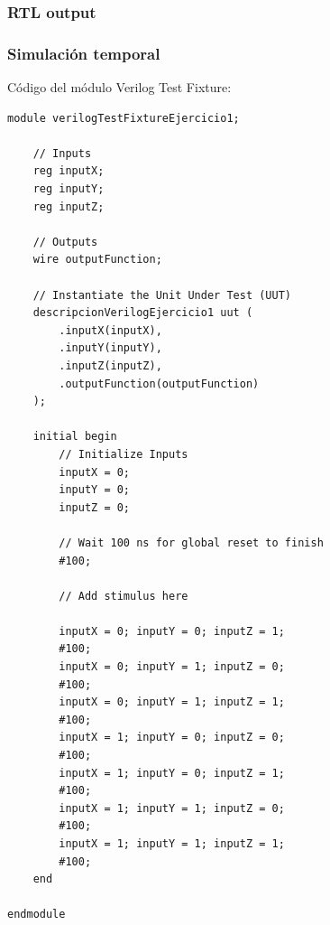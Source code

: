 \subsubsection{RTL output}


\subsubsection{Simulación temporal}

\noindent Código del módulo Verilog Test Fixture:

\begin{lstlisting}
module verilogTestFixtureEjercicio1;

	// Inputs
	reg inputX;
	reg inputY;
	reg inputZ;

	// Outputs
	wire outputFunction;

	// Instantiate the Unit Under Test (UUT)
	descripcionVerilogEjercicio1 uut (
		.inputX(inputX), 
		.inputY(inputY), 
		.inputZ(inputZ), 
		.outputFunction(outputFunction)
	);

	initial begin
		// Initialize Inputs
		inputX = 0;
		inputY = 0;
		inputZ = 0;

		// Wait 100 ns for global reset to finish
		#100;
        
		// Add stimulus here
		
		inputX = 0;	inputY = 0; inputZ = 1;
		#100;
		inputX = 0; inputY = 1;	inputZ = 0;
		#100;
		inputX = 0; inputY = 1; inputZ = 1;
		#100;
		inputX = 1; inputY = 0; inputZ = 0;
		#100;
		inputX = 1; inputY = 0; inputZ = 1;
		#100;
		inputX = 1; inputY = 1; inputZ = 0;
		#100;
		inputX = 1; inputY = 1; inputZ = 1;
		#100;
	end
      
endmodule
\end{lstlisting}

